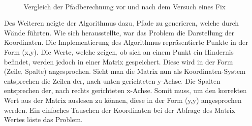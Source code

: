 \begin{enumerate}[leftmargin=*]
    \begin{figure}[H]
        \centering
        \\
        \caption{Vergleich der Pfadberechnung vor und nach dem Versuch eines Fix}
    \end{figure}

    Des Weiteren neigte der Algorithmus dazu, Pfade zu generieren, welche durch Wände führten.
    Wie sich herausstellte, war das Problem die Darstellung der Koordinaten.
    Die Implementierung des Algorithmus repräsentierte Punkte in der Form (x,y).
    Die Werte, welche zeigen, ob sich an einem Punkt ein Hindernis befindet, werden jedoch in einer Matrix gespeichert.
    Diese wird in der Form (Zeile, Spalte) angesprochen.
    Sieht man die Matrix nun als Koordinaten-System entsprechen die Zeilen der, nach unten gerichteten y-Achse.
    Die Spalten entsprechen der, nach rechts gerichteten x-Achse.
    Somit muss, um den korrekten Wert aus der Matrix auslesen zu können, diese in der Form (y,y) angesprochen werden.
    Ein einfaches Tauschen der Koordinaten bei der Abfrage des Matrix-Wertes löste das Problem.
\end{enumerate}

